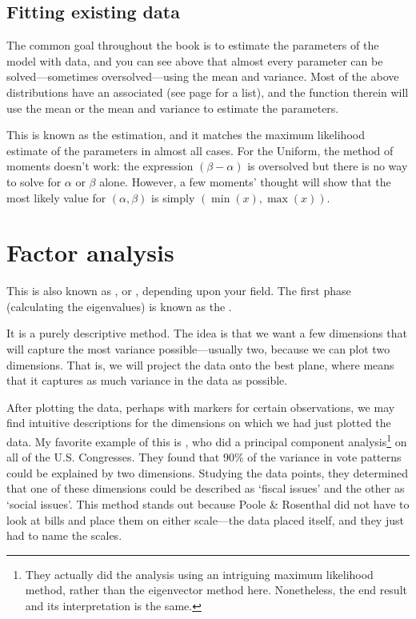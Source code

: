 \subsection{Fitting existing data}
The common goal throughout the book is to estimate the parameters of the
model with data, and you can see above that almost every parameter can
be solved---sometimes oversolved---using the mean and variance. Most of
the above distributions have an  associated (see page
\pageref{modellist} for a list), and the  function therein
will use the mean or the mean and variance to estimate the parameters.

This is known as the  estimation, and it
matches the maximum likelihood estimate of the parameters in almost all
cases. For the Uniform, the method of moments doesn't work: the
expression $(\beta - \alpha)$ is oversolved but there is no way to solve
for $\alpha$ or $\beta$ alone. However, a few moments' thought will show that the
most likely value for $(\alpha, \beta)$ is simply $(\min(x), \max(x))$.


\section{Factor analysis} \label{pca} 
This is also known as , or , depending upon your field. 
The first phase (calculating the eigenvalues) is known as the .

It is a purely descriptive method.  The idea is that we want a few
dimensions that will capture the most variance possible---usually two,
because we can plot two dimensions. That is, we will project the data
onto the best plane, where  means that it captures as much
variance in the data as possible.

After plotting the data, perhaps with markers for certain observations,
we may find intuitive descriptions for the dimensions on which we had just plotted the
data. My favorite example of this is \citet{poole:rosenthal},
who did a principal component analysis\footnote{They actually did
the analysis using an intriguing maximum likelihood method, rather
than the eigenvector method here. Nonetheless, the end result and its
interpretation is the same.} on all of the U.S. Congresses. They found
that 90\% of the variance in vote patterns could be explained by two dimensions.
Studying the data points, they determined that one of these dimensions could be
described as `fiscal issues' and the other as `social issues'. This method stands
out because Poole \& Rosenthal did not have to look at bills and place them on
either scale---the data placed itself, and they just had to name the scales.


